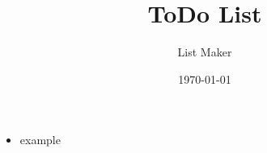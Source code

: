 \documentclass[a4paper,british]{article}
\begin{document}
\title{ToDo List}
\date{\today}
\author{List Maker}
\maketitle
\begin{itemize}
\item example 
\end{itemize}
\end{document}
